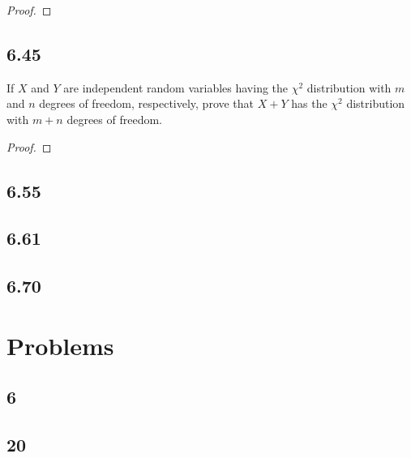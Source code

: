 \documentclass{article}
\begin{document}
\begin{proof}

\end{proof}

\subsection*{6.45}
If $X$ and $Y$ are independent random variables having the $\chi^2$ distribution
with $m$ and $n$ degrees of freedom, respectively, prove that $X+Y$ has the
$\chi^2$ distribution with $m+n$ degrees of freedom.

\begin{proof}

\end{proof}

\subsection*{6.55}
\subsection*{6.61}
\subsection*{6.70}

\section*{Problems}
\subsection*{6}
\subsection*{20}
\end{document}
